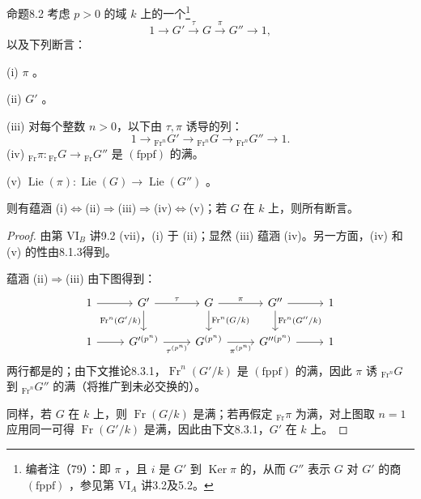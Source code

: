 \begin{SGAresult}{命题}{8.2}
考虑 $p>0$ 的域 $k$ 上的一个\footnote{编者注（79）：即 $\pi$ ，且 $i$ 是 $G'$ 到 $\operatorname{Ker}\pi$ 的，从而 $G''$ 表示 $G$ 对 $G'$ 的商 $(\mathrm{fppf})$ ，参见第 VI$_A$ 讲3.2及5.2。}
\[
 1\longrightarrow G'\xrightarrow{\tau}G\xrightarrow{\pi}G''\longrightarrow1,
\]
以及下列断言：

(i)  $\pi$ 。

(ii) $G'$ 。

(iii) 对每个整数 $n>0$，以下由 $\tau,\pi$ 诱导的列：
\[
 1\longrightarrow {}_{\operatorname{Fr}^n}G'\longrightarrow{}_{\operatorname{Fr}^n}G
 \longrightarrow{}_{\operatorname{Fr}^n}G''\longrightarrow1.
\]
(iv)  ${}_{\operatorname{Fr}}\pi:{}_{\operatorname{Fr}}G\to{}_{\operatorname{Fr}}G''$ 是 $(\mathrm{fppf})$ 的满。

(v)  $\operatorname{Lie}(\pi):\operatorname{Lie}(G)\to\operatorname{Lie}(G'')$ 。

则有蕴涵 (i)$\Leftrightarrow$(ii)$\Rightarrow$(iii)$\Rightarrow$(iv)$\Leftrightarrow$(v)；若 $G$ 在 $k$ 上，则所有断言。
\end{SGAresult}
\begin{proof}
由第 VI$_B$ 讲9.2 (vii)，(i) 于 (ii)；显然 (iii) 蕴涵 (iv)。另一方面，(iv) 和 (v) 的性由8.1.3得到。

蕴涵 (ii)$\Rightarrow$(iii) 由下图得到：
\[
\begin{tikzcd}
 1\arrow[r]&G'\arrow[r,"\tau"]\arrow[d,"\operatorname{Fr}^n(G'/k)"']
 &G\arrow[r,"\pi"]\arrow[d,"\operatorname{Fr}^n(G/k)"]
 &G''\arrow[r]\arrow[d,"\operatorname{Fr}^n(G''/k)"]&1\\
 1\arrow[r]&G'^{(p^n)}\arrow[r,"\tau^{(p^n)}"']
 &G^{(p^n)}\arrow[r,"\pi^{(p^n)}"']&G''^{(p^n)}\arrow[r]&1
\end{tikzcd}
\]
两行都是的；由下文推论8.3.1，$\operatorname{Fr}^n(G'/k)$ 是 $(\mathrm{fppf})$ 的满，因此 $\pi$ 诱 ${}_{\operatorname{Fr}^n}G$ 到 ${}_{\operatorname{Fr}^n}G''$ 的满（将推广到未必交换的）。

同样，若 $G$ 在 $k$ 上，则 $\operatorname{Fr}(G/k)$ 是满；若再假定 ${}_{\operatorname{Fr}}\pi$ 为满，对上图取 $n=1$ 应用同一可得 $\operatorname{Fr}(G'/k)$ 是满，因此由下文8.3.1，$G'$ 在 $k$ 上。
\end{proof}

